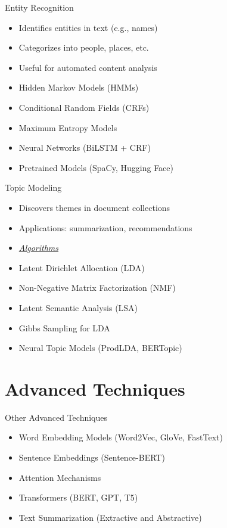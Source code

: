 \begin{frame}{Entity Recognition}
\begin{multicols}{2}
\begin{itemize}
    \item Identifies entities in text (e.g., names)
    \item Categorizes into people, places, etc.
    \item Useful for automated content analysis
\end{itemize}
\vfill\null\columnbreak
\begin{itemize}
    \item Hidden Markov Models (HMMs)
    \item Conditional Random Fields (CRFs)
    \item Maximum Entropy Models
    \item Neural Networks (BiLSTM + CRF)
    \item Pretrained Models (SpaCy, Hugging Face)
\end{itemize}
\end{multicols}
\end{frame}

\begin{frame}{Topic Modeling}
\begin{multicols}{2}
\begin{itemize}
    \item Discovers themes in document collections
    \item Applications: summarization, recommendations
\end{itemize}
\vfill \null
\columnbreak
\begin{itemize}
\item[] {\larger \underline{\textit{\color{yellow}Algorithms}}}
    \item Latent Dirichlet Allocation (LDA)
    \item Non-Negative Matrix Factorization (NMF)
    \item Latent Semantic Analysis (LSA)
    \item Gibbs Sampling for LDA
    \item Neural Topic Models (ProdLDA, BERTopic)
\end{itemize}
\end{multicols}
\end{frame}
\section{Advanced Techniques}
\begin{frame}{Other Advanced Techniques}
\begin{itemize}
    \item Word Embedding Models (Word2Vec, GloVe, FastText)
    \item Sentence Embeddings (Sentence-BERT)
    \item Attention Mechanisms
    \item Transformers (BERT, GPT, T5)
    \item Text Summarization (Extractive and Abstractive)
\end{itemize}
\end{frame}

